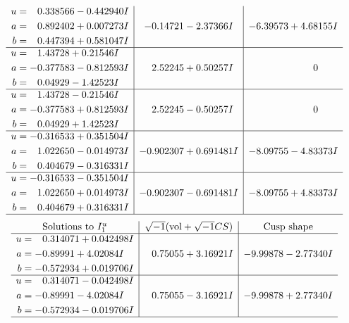 \documentclass[1p]{elsarticle_modified}
\theoremstyle{definition}
\newcommand{\I}{\sqrt{-1}}
\begin{document}
$$\begin{array}{c|c|c}
\begin{aligned}
u &= \phantom{-}0.338566 - 0.442940 I \\
a &= \phantom{-}0.892402 + 0.007273 I \\
b &= \phantom{-}0.447394 + 0.581047 I\end{aligned}
 & -0.14721 - 2.37366 I & -6.39573 + 4.68155 I \\ \hline\begin{aligned}
u &= \phantom{-}1.43728 + 0.21546 I \\
a &= -0.377583 - 0.812593 I \\
b &= \phantom{-}0.04929 - 1.42523 I\end{aligned}
 & \phantom{-}2.52245 + 0.50257 I & \phantom{-0.000000 } 0 \\ \hline\begin{aligned}
u &= \phantom{-}1.43728 - 0.21546 I \\
a &= -0.377583 + 0.812593 I \\
b &= \phantom{-}0.04929 + 1.42523 I\end{aligned}
 & \phantom{-}2.52245 - 0.50257 I & \phantom{-0.000000 } 0 \\ \hline\begin{aligned}
u &= -0.316533 + 0.351504 I \\
a &= \phantom{-}1.022650 - 0.014973 I \\
b &= \phantom{-}0.404679 - 0.316331 I\end{aligned}
 & -0.902307 + 0.691481 I & -8.09755 - 4.83373 I \\ \hline\begin{aligned}
u &= -0.316533 - 0.351504 I \\
a &= \phantom{-}1.022650 + 0.014973 I \\
b &= \phantom{-}0.404679 + 0.316331 I\end{aligned}
 & -0.902307 - 0.691481 I & -8.09755 + 4.83373 I\\
 \hline 
 \end{array}$$\newpage$$\begin{array}{c|c|c}  
\text{Solutions to }I^u_{1}& \I (\text{vol} + \sqrt{-1}CS) & \text{Cusp shape}\\
 \hline 
\begin{aligned}
u &= \phantom{-}0.314071 + 0.042498 I \\
a &= -0.89991 + 4.02084 I \\
b &= -0.572934 + 0.019706 I\end{aligned}
 & \phantom{-}0.75055 + 3.16921 I & -9.99878 - 2.77340 I \\ \hline\begin{aligned}
u &= \phantom{-}0.314071 - 0.042498 I \\
a &= -0.89991 - 4.02084 I \\
b &= -0.572934 - 0.019706 I\end{aligned}
 & \phantom{-}0.75055 - 3.16921 I & -9.99878 + 2.77340 I\\
 \hline 
 \end{array}$$\newpage\newpage\renewcommand{\arraystretch}{1}
\end{document}
